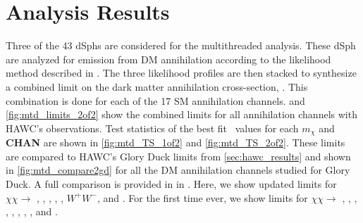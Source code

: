 \section{Analysis Results}\label{sec:mtd_results}

Three of the 43 \LS dSphs are considered for the multithreaded analysis.
These dSph are analyzed for emission from DM annihilation according to the likelihood method described in .
The three likelihood profiles are then stacked to synthesize a combined limit on the dark matter annihilation cross-section, \sv.
This combination is done for each of the 17 SM annihilation channels.
 and \cref{fig:mtd_limits_2of2} show the combined limits for all annihilation channels with HAWC's observations.
Test statistics of the best fit \sv~values for each $m_\chi$ and \textbf{CHAN} are shown in \cref{fig:mtd_TS_1of2} and \cref{fig:mtd_TS_2of2}.
These limits are compared to HAWC's Glory Duck limits from \cref{sec:hawc_results} and shown in \cref{fig:mtd_compare2gd} for all the DM annihilation channels studied for Glory Duck.
A full comparison is provided in  in .
Here, we show updated limits for $\chi\chi \rightarrow$ , , \parpar{\mu}, \parpar{\tau}, , $W^+W^-$, \pp{\gamma} and .
For the first time ever, we show limits for $\chi\chi \rightarrow$ , , , , , \parpar{\nu_\mu}, \parpar{\nu_\tau}, , and .

